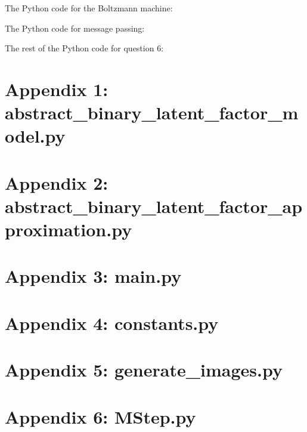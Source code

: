 \documentclass[12pt]{article}
\begin{document}
\newpage
The Python code for the Boltzmann machine:


\newpage
The Python code for message passing:


\newpage
The rest of the Python code for question 6:


\newpage
\section*{Appendix 1: abstract\_binary\_latent\_factor\_model.py}


\newpage
\section*{Appendix 2: abstract\_binary\_latent\_factor\_approximation.py}


\newpage
\section*{Appendix 3: main.py}


\newpage
\section*{Appendix 4: constants.py}


\newpage
\section*{Appendix 5: generate\_images.py}

\newpage
\section*{Appendix 6: MStep.py}

\end{document}
